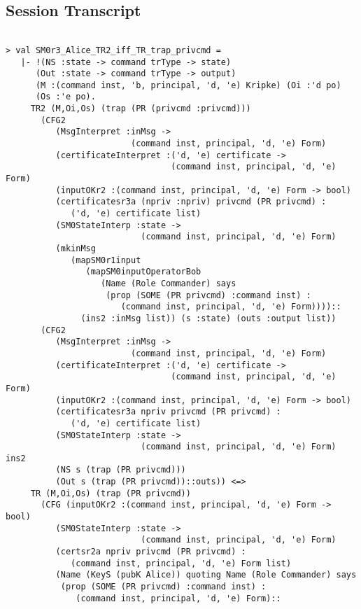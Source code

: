 \documentclass{report}
\begin{document}
\subsection{Session Transcript}
\label{trans8}
\begin{session}
  \begin{scriptsize}
\begin{verbatim}

> val SM0r3_Alice_TR2_iff_TR_trap_privcmd =
   |- !(NS :state -> command trType -> state)
      (Out :state -> command trType -> output)
      (M :(command inst, 'b, principal, 'd, 'e) Kripke) (Oi :'d po)
      (Os :'e po).
     TR2 (M,Oi,Os) (trap (PR (privcmd :privcmd)))
       (CFG2
          (MsgInterpret :inMsg ->
                         (command inst, principal, 'd, 'e) Form)
          (certificateInterpret :('d, 'e) certificate ->
                                 (command inst, principal, 'd, 'e) Form)
          (inputOKr2 :(command inst, principal, 'd, 'e) Form -> bool)
          (certificatesr3a (npriv :npriv) privcmd (PR privcmd) :
             ('d, 'e) certificate list)
          (SM0StateInterp :state ->
                           (command inst, principal, 'd, 'e) Form)
          (mkinMsg
             (mapSM0r1input
                (mapSM0inputOperatorBob
                   (Name (Role Commander) says
                    (prop (SOME (PR privcmd) :command inst) :
                       (command inst, principal, 'd, 'e) Form))))::
               (ins2 :inMsg list)) (s :state) (outs :output list))
       (CFG2
          (MsgInterpret :inMsg ->
                         (command inst, principal, 'd, 'e) Form)
          (certificateInterpret :('d, 'e) certificate ->
                                 (command inst, principal, 'd, 'e) Form)
          (inputOKr2 :(command inst, principal, 'd, 'e) Form -> bool)
          (certificatesr3a npriv privcmd (PR privcmd) :
             ('d, 'e) certificate list)
          (SM0StateInterp :state ->
                           (command inst, principal, 'd, 'e) Form) ins2
          (NS s (trap (PR privcmd)))
          (Out s (trap (PR privcmd))::outs)) <=>
     TR (M,Oi,Os) (trap (PR privcmd))
       (CFG (inputOKr2 :(command inst, principal, 'd, 'e) Form -> bool)
          (SM0StateInterp :state ->
                           (command inst, principal, 'd, 'e) Form)
          (certsr2a npriv privcmd (PR privcmd) :
             (command inst, principal, 'd, 'e) Form list)
          (Name (KeyS (pubK Alice)) quoting Name (Role Commander) says
           (prop (SOME (PR privcmd) :command inst) :
              (command inst, principal, 'd, 'e) Form)::

\end{verbatim}
\end{scriptsize}
\end{session}
\end{document}
